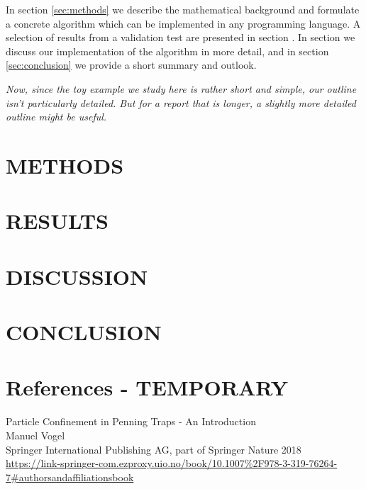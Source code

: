 \documentclass[english,notitlepage,reprint,nofootinbib]{revtex4-1}  %
\begin{document}
In section \ref{sec:methods} we describe the mathematical background and formulate a concrete algorithm which can be implemented in any programming language. A selection of results from a validation test are presented in section \label{sec:results}. In section \label{sec:discussion} we discuss our implementation of the algorithm in more detail, and in section \ref{sec:conclusion} we provide a short summary and outlook.

\textit{Now, since the toy example we study here is rather short and simple, our outline isn't particularly detailed. But for a report that is longer, a slightly more detailed outline might be useful.}

\section{METHODS}

\section{RESULTS}

\section{DISCUSSION}

\section{CONCLUSION}

\section{References - TEMPORARY}

\noindent
Particle Confinement in Penning Traps - An Introduction \\
Manuel Vogel \\
Springer International Publishing AG, part of Springer Nature 2018 \\
\url{https://link-springer-com.ezproxy.uio.no/book/10.1007%2F978-3-319-76264-7#authorsandaffiliationsbook}
\end{document}
